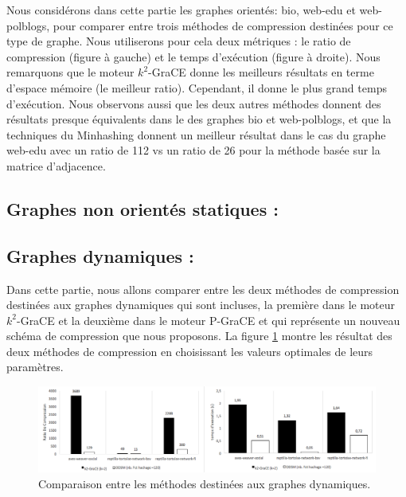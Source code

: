 	Nous considérons dans cette partie les graphes orientés: bio, web-edu et web-polblogs, pour comparer entre trois méthodes de compression destinées pour ce type de graphe. Nous utiliserons pour cela deux métriques : le ratio de compression (figure à gauche) et le temps d'exécution (figure à droite). Nous remarquons que le moteur $k^2$-GraCE donne les meilleurs résultats en terme d'espace mémoire (le meilleur ratio). Cependant, il donne le plus grand temps d'exécution. Nous observons aussi que les deux autres méthodes donnent des résultats presque équivalents dans le des graphes bio et web-polblogs, et que la techniques du Minhashing donnent un meilleur résultat dans le cas du graphe web-edu avec un ratio de 112 vs un ratio de 26 pour la méthode basée sur la matrice d'adjacence. 
	
	\subsection{Graphes non orientés statiques :}
	
	\subsection{Graphes dynamiques :}
	
	Dans cette partie, nous allons comparer entre les deux méthodes de compression destinées aux graphes dynamiques qui sont incluses, la première dans le moteur $k^2$-GraCE et la deuxième dans le moteur P-GraCE et qui représente un nouveau schéma de compression que nous proposons. La figure \ref{fig:comp-dyn} montre les résultat des deux méthodes de compression en choisissant les valeurs optimales de leurs paramètres.
	
	\begin{figure}[H]
		\begin{center}
		 \includegraphics[scale=0.4]{ressources/image/dynComp.png}
			
			
			\caption{Comparaison entre les méthodes destinées aux graphes dynamiques.}
			\label{fig:comp-dyn}
		\end{center}
	\end{figure}
	
